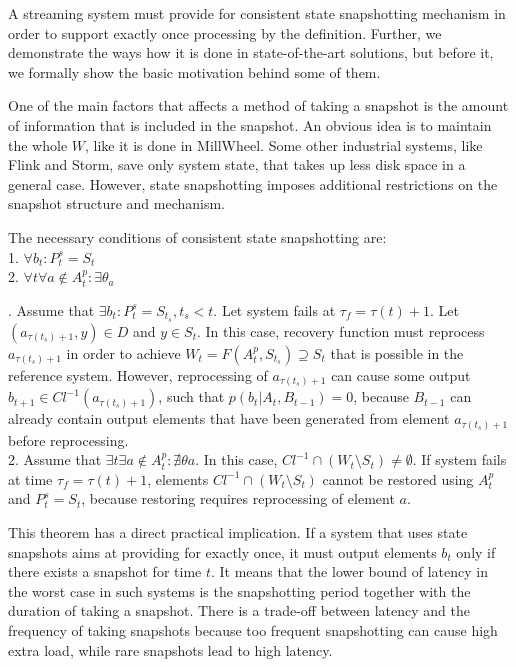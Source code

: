 A streaming system must provide for consistent state snapshotting mechanism in order to support exactly once processing by the definition. Further, we demonstrate the ways how it is done in state-of-the-art solutions, but before it, we formally show the basic motivation behind some of them. 

One of the main factors that affects a method of taking a snapshot is the amount of information that is included in the snapshot. An obvious idea is to maintain the whole $W$, like it is done in MillWheel. Some other industrial systems, like Flink and Storm, save only system state, that takes up less disk space in a general case. However, state snapshotting imposes additional restrictions on the snapshot structure and mechanism.

\begin{theorem}
\label{necessary_conditions}
The necessary conditions of consistent state snapshotting are:\\
1. $\forall{b_t}:P^{s}_t=S_t$\\
2. $\forall{t}\forall{a}\notin{A^{p}_t} : \exists{\theta_a}$
\end{theorem}
\begin{sketch}
$ $. Assume that $\exists{b_t}:P^{s}_t = S_{t_s}, t_s < t$. Let system fails at $\tau_f = \tau(t)+1$. Let $(a_{\tau(t_s)+1},y)\in{D}$ and $y\in{S_t}$. In this case, recovery function must reprocess $a_{\tau(t_s)+1}$ in order to achieve $W_t=F(A^{p}_t,S_{t_s})\supseteq{S_t}$ that is possible in the reference system. However, reprocessing of $a_{\tau(t_s)+1}$ can cause some output $ b_{t+1}\in{Cl^{-1}(a_{\tau(t_s)+1})}$, such that $p(b_{t}|A_t,B_{t-1})=0$, because $B_{t-1}$ can already contain output elements that have been generated from element $a_{\tau(t_s)+1}$ before reprocessing. \\
2. Assume that $\exists{t} \exists{a} \notin{A^{p}_t}:\nexists{\theta{a}}$. In this case, $Cl^{-1} \cap (W_t \setminus{S_t}) \neq \emptyset$. If system fails at time $\tau_f=\tau(t)+1$, elements $Cl^{-1} \cap (W_t \setminus{S_t})$ cannot be restored using $A^{p}_t$ and $P^{s}_t=S_t$, because restoring requires reprocessing of element $a$.
\end{sketch}

This theorem has a direct practical implication. If a system that uses state snapshots aims at providing for exactly once, it must output elements $b_t$ only if there exists a snapshot for time $t$. It means that the lower bound of latency in the worst case in such systems is the snapshotting period together with the duration of taking a snapshot. There is a trade-off between latency and the frequency of taking snapshots because too frequent snapshotting can cause high extra load, while rare snapshots lead to high latency.

